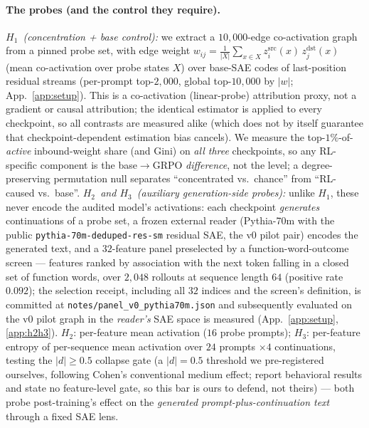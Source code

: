 \documentclass{article}
\newcommand{\Hone}{\ensuremath{H_{1}}}
\newcommand{\Htwo}{\ensuremath{H_{2}}}
\newcommand{\Hthree}{\ensuremath{H_{3}}}
\begin{document}
\paragraph{The probes (and the control they require).} \emph{\Hone\ (concentration + base control):} we extract a $10{,}000$-edge co-activation graph from a pinned probe set, with edge weight $w_{ij}=\frac{1}{|X|}\sum_{x\in X} z^{\mathrm{src}}_i(x)\, z^{\mathrm{dst}}_j(x)$ (mean co-activation over probe states $X$) over base-SAE codes of last-position residual streams (per-prompt top-$2{,}000$, global top-$10{,}000$ by $|w|$; App.~\ref{app:setup}). This is a co-activation (linear-probe) attribution proxy, not a gradient or causal attribution; the identical estimator is applied to every checkpoint, so all contrasts are measured alike (which does not by itself guarantee that checkpoint-dependent estimation bias cancels). We measure the top-$1\%$-of-\emph{active} inbound-weight share (and Gini) on \emph{all three} checkpoints, so any RL-specific component is the base$\to$GRPO \emph{difference}, not the level; a degree-preserving permutation null separates ``concentrated vs.\ chance'' from ``RL-caused vs.\ base''. \emph{\Htwo\ and \Hthree\ (auxiliary generation-side probes):} unlike \Hone, these never encode the audited model's activations: each checkpoint \emph{generates} continuations of a probe set, a frozen external reader (Pythia-70m with the public \texttt{pythia-70m-deduped-res-sm} residual SAE, the v0 pilot pair) encodes the generated text, and a $32$-feature panel preselected by a function-word-outcome screen --- features ranked by association with the next token falling in a closed set of function words, over $2{,}048$ rollouts at sequence length $64$ (positive rate $0.092$); the selection receipt, including all $32$ indices and the screen's definition, is committed at \texttt{notes/panel\_v0\_pythia70m.json} and subsequently evaluated on the v0 pilot graph in the \emph{reader's} SAE space is measured (App.~\ref{app:setup}, \ref{app:h2h3}). \Htwo: per-feature mean activation ($16$ probe prompts); \Hthree: per-feature entropy of per-sequence mean activation over $24$ prompts $\times4$ continuations, testing the $|d|\geq0.5$ collapse gate (a $|d|=0.5$ threshold we pre-registered ourselves, following Cohen's conventional medium effect; \citet{yue2025,wang2025} report behavioral results and state no feature-level gate, so this bar is ours to defend, not theirs) --- both probe post-training's effect on the \emph{generated prompt-plus-continuation text} through a fixed SAE lens.
\end{document}
